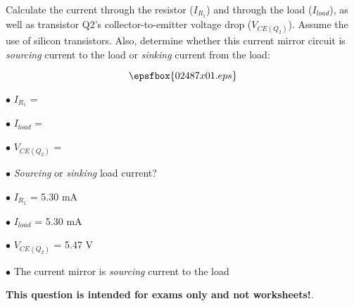 

Calculate the current through the resistor ($I_{R_1}$) and through the load ($I_{load}$), as well as transistor Q2's collector-to-emitter voltage drop ($V_{CE(Q_2)}$).  Assume the use of silicon transistors.  Also, determine whether this current mirror circuit is {\it sourcing} current to the load or {\it sinking} current from the load:

$$\epsfbox{02487x01.eps}$$

\medskip
\item{$\bullet$} $I_{R_1}$ = 
\item{$\bullet$} $I_{load}$ = 
\item{$\bullet$} $V_{CE(Q_2)}$ = 
\item{$\bullet$} {\it Sourcing} or {\it sinking} load current?
\medskip







\medskip
\item{$\bullet$} $I_{R_1}$ = 5.30 mA
\item{$\bullet$} $I_{load}$ = 5.30 mA
\item{$\bullet$} $V_{CE(Q_2)}$ = 5.47 V
\item{$\bullet$} The current mirror is {\it sourcing} current to the load
\medskip







{\bf This question is intended for exams only and not worksheets!}.




